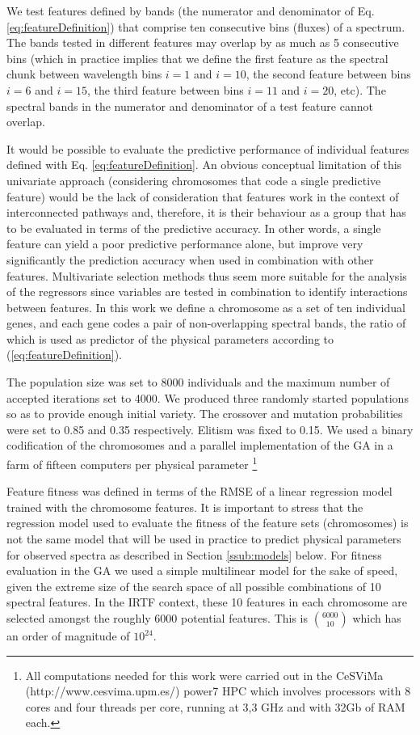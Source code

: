 We test features defined by bands (the numerator and denominator of
Eq. \ref{eq:featureDefinition}) that comprise ten consecutive bins
(fluxes) of a spectrum. The bands tested in different features may
overlap by as much as 5 consecutive bins (which in practice implies
that we define the first feature as the spectral chunk between
wavelength bins $i=1$ and $i=10$, the second feature between bins
$i=6$ and $i=15$, the third feature between bins $i=11$ and $i=20$,
etc). The spectral bands in the numerator and denominator of a test
feature cannot overlap.

It would be possible to evaluate the predictive performance of
individual features defined with Eq. \ref{eq:featureDefinition}. An obvious
conceptual limitation of this univariate approach (considering
chromosomes that code a single predictive feature) would be the lack
of consideration that features work in the context of interconnected
pathways and, therefore, it is their behaviour as a group that has to
be evaluated in terms of the predictive accuracy. In other words, a
single feature can yield a poor predictive performance alone, but
improve very significantly the prediction accuracy when used in
combination with other features. Multivariate selection methods thus
seem more suitable for the analysis of the regressors since variables
are tested in combination to identify interactions between
features. In this work we define a chromosome as a set of ten
individual genes, and each gene codes a pair of non-overlapping
spectral bands, the ratio of which is used as predictor of the
physical parameters according to (\ref{eq:featureDefinition}).

The population size was set to 8000 individuals and the maximum number
of accepted iterations set to 4000. We produced three randomly started
populations so as to provide enough initial variety. The crossover and
mutation probabilities were set to 0.85 and 0.35 respectively. Elitism
was fixed to 0.15. We used a binary codification of the chromosomes
and a parallel implementation of the GA in a farm of fifteen computers
per physical parameter \footnote{All computations needed for this work
were carried out in the CeSViMa (http://www.cesvima.upm.es/) power7
HPC which involves processors with 8 cores and four threads per core,
running at 3,3 GHz and with 32Gb of RAM each.}

Feature fitness was defined in terms of the RMSE of a linear
regression model trained with the chromosome features. It is important
to stress that the regression model used to evaluate the fitness of
the feature sets (chromosomes) is not the same model that will be used
in practice to predict physical parameters for observed spectra as
described in Section \ref{ssub:models} below. For fitness evaluation
in the GA we used a simple multilinear model for the sake of speed,
given the extreme size of the search space of all possible
combinations of 10 spectral features. In the IRTF context, these 10
features in each chromosome are selected amongst the roughly 6000
potential features. This is $\binom{6000}{10}$ which has an order of
magnitude of $10^{24}$.

